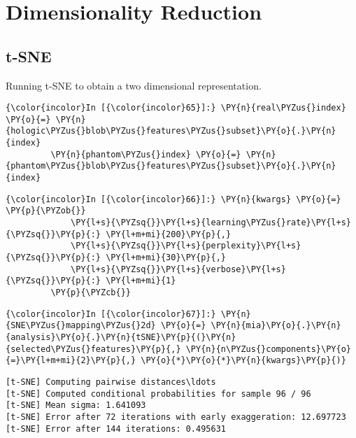     \section{Dimensionality Reduction}\label{dimensionality-reduction}

\subsection{t-SNE}\label{t-sne}

Running t-SNE to obtain a two dimensional representation.

    \begin{Verbatim}[commandchars=\\\{\}]
{\color{incolor}In [{\color{incolor}65}]:} \PY{n}{real\PYZus{}index} \PY{o}{=} \PY{n}{hologic\PYZus{}blob\PYZus{}features\PYZus{}subset}\PY{o}{.}\PY{n}{index}
         \PY{n}{phantom\PYZus{}index} \PY{o}{=} \PY{n}{phantom\PYZus{}blob\PYZus{}features\PYZus{}subset}\PY{o}{.}\PY{n}{index}
\end{Verbatim}

    \begin{Verbatim}[commandchars=\\\{\}]
{\color{incolor}In [{\color{incolor}66}]:} \PY{n}{kwargs} \PY{o}{=} \PY{p}{\PYZob{}}
             \PY{l+s}{\PYZsq{}}\PY{l+s}{learning\PYZus{}rate}\PY{l+s}{\PYZsq{}}\PY{p}{:} \PY{l+m+mi}{200}\PY{p}{,}
             \PY{l+s}{\PYZsq{}}\PY{l+s}{perplexity}\PY{l+s}{\PYZsq{}}\PY{p}{:} \PY{l+m+mi}{30}\PY{p}{,}
             \PY{l+s}{\PYZsq{}}\PY{l+s}{verbose}\PY{l+s}{\PYZsq{}}\PY{p}{:} \PY{l+m+mi}{1}
         \PY{p}{\PYZcb{}}
\end{Verbatim}

    \begin{Verbatim}[commandchars=\\\{\}]
{\color{incolor}In [{\color{incolor}67}]:} \PY{n}{SNE\PYZus{}mapping\PYZus{}2d} \PY{o}{=} \PY{n}{mia}\PY{o}{.}\PY{n}{analysis}\PY{o}{.}\PY{n}{tSNE}\PY{p}{(}\PY{n}{selected\PYZus{}features}\PY{p}{,} \PY{n}{n\PYZus{}components}\PY{o}{=}\PY{l+m+mi}{2}\PY{p}{,} \PY{o}{*}\PY{o}{*}\PY{n}{kwargs}\PY{p}{)}
\end{Verbatim}

    \begin{Verbatim}[commandchars=\\\{\}]
[t-SNE] Computing pairwise distances\ldots
[t-SNE] Computed conditional probabilities for sample 96 / 96
[t-SNE] Mean sigma: 1.641093
[t-SNE] Error after 72 iterations with early exaggeration: 12.697723
[t-SNE] Error after 144 iterations: 0.495631
    \end{Verbatim}

